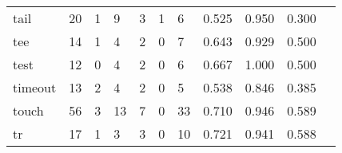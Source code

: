 \begin{longtable}{lp{1.2cm}p{1.2cm}p{1.2cm}p{1.2cm}p{1.2cm}p{1.2cm}p{1.2cm}p{1.2cm}p{1.2cm}p{1.2cm}}
tail      &                                    20 &                                                  1 &                                                  9 &                                                  3 &                                                  1 &                                                  6 &                                         0.525 &                                              0.950 &                                              0.300 \\
tee       &                                    14 &                                                  1 &                                                  4 &                                                  2 &                                                  0 &                                                  7 &                                         0.643 &                                              0.929 &                                              0.500 \\
test      &                                    12 &                                                  0 &                                                  4 &                                                  2 &                                                  0 &                                                  6 &                                         0.667 &                                              1.000 &                                              0.500 \\
timeout   &                                    13 &                                                  2 &                                                  4 &                                                  2 &                                                  0 &                                                  5 &                                         0.538 &                                              0.846 &                                              0.385 \\
touch     &                                    56 &                                                  3 &                                                 13 &                                                  7 &                                                  0 &                                                 33 &                                         0.710 &                                              0.946 &                                              0.589 \\
tr        &                                    17 &                                                  1 &                                                  3 &                                                  3 &                                                  0 &                                                 10 &                                         0.721 &                                              0.941 &                                              0.588 \\

\end{longtable}
